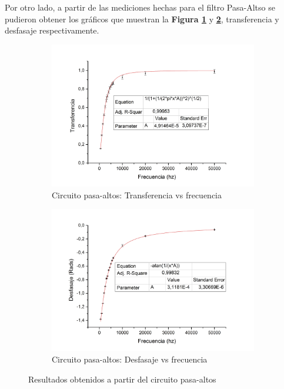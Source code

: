 \documentclass[11pt,a4paper]{article}
\begin{document}
\bigskip

Por otro lado, a partir de las mediciones hechas para el filtro Pasa-Altso se pudieron obtener los gráficos que muestran la \textbf{Figura \ref{subfig:PA.a}} y \textbf{\ref{subfig:PA.b}}, transferencia y desfasaje respectivamente.

\begin{figure}[h]
\begin{subfigure}{0.5\textwidth}
\includegraphics[scale=0.34]{PA_TRANSFERENCIA}
  \caption{Circuito pasa-altos: Transferencia vs frecuencia }
  \label{subfig:PA.a}
\end{subfigure}
\begin{subfigure}{0.5\textwidth}
\includegraphics[scale=0.34]{PA_DESFASAJE}
  \caption{Circuito pasa-altos: Desfasaje vs frecuencia}
  \label{subfig:PA.b}
\end{subfigure}
  \caption{Resultados obtenidos a partir del circuito pasa-altos}
  \label{fig:PA}
\end{figure}
\end{document}
